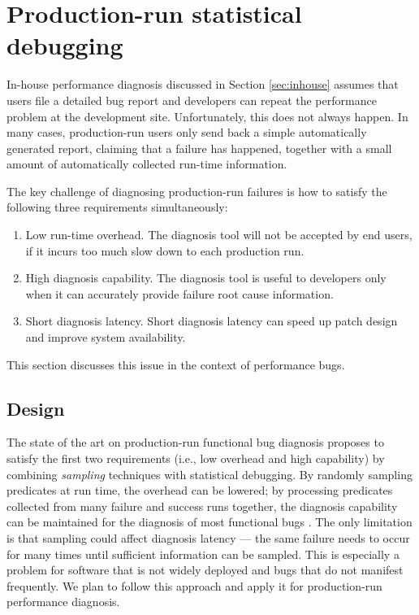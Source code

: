 \section{Production-run statistical debugging}
\label{sec:lbr}
In-house performance diagnosis discussed in Section \ref{sec:inhouse} assumes
that users file a detailed bug report and developers can repeat the 
performance problem at the development site. Unfortunately, this does not always
happen. In many cases, production-run users only send 
back a simple automatically generated report, claiming that a failure has 
happened, together with a small amount
of automatically collected run-time information. 

The key challenge of diagnosing production-run failures is how to satisfy the
following three requirements simultaneously:

\begin{enumerate}
\item Low run-time overhead. 
The diagnosis tool will not be accepted by end users, if it incurs too much
slow down to each production run.

\item High diagnosis capability. 
The diagnosis tool is useful to developers only when it can accurately 
provide failure root cause information.

\item Short diagnosis latency. 
Short diagnosis latency can speed up patch design and improve system
availability.
\end{enumerate}

This section discusses this issue
in the context of performance bugs.

\subsection{Design}
The state of the art on production-run
functional bug diagnosis \citep{liblit03,liblit05,CCI,joy.asplos13} proposes
to satisfy the first two requirements (i.e., low overhead and high capability)
by combining  
\textit{sampling} techniques with
statistical debugging.
By randomly sampling predicates at run time, the overhead can be lowered;
by processing predicates collected from many failure and success runs
together, the diagnosis capability can be maintained for the diagnosis of most
functional bugs \citep{liblit03,liblit05,CCI,joy.asplos13}.
The only limitation is that sampling could affect diagnosis latency 
--- the same failure needs to occur for many times until sufficient information
can be sampled. This is especially a problem for software that is not widely
deployed and bugs that do not manifest frequently.
We plan to follow this approach and apply it for production-run performance
diagnosis.

